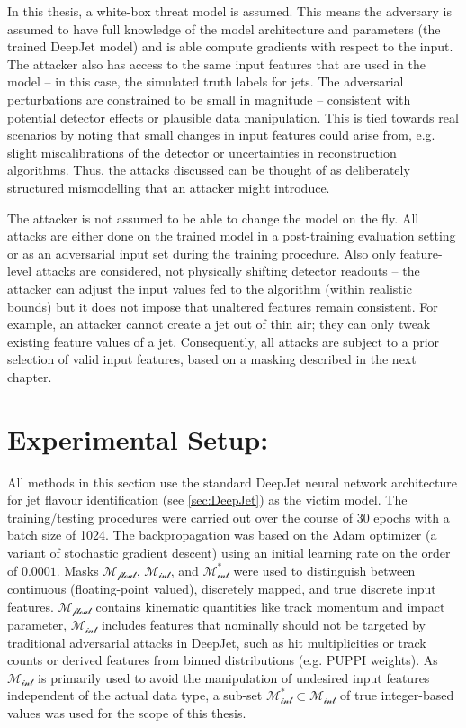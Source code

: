In this thesis, a white-box threat model is assumed. This means the adversary is assumed to have full knowledge of the model architecture and parameters (the trained DeepJet model) and is able compute gradients with respect to the input. The attacker also has access to the same input features that are used in the model – in this case, the simulated truth labels for jets. The adversarial perturbations are constrained to be small in magnitude – consistent with potential detector effects or plausible data manipulation. This is tied towards real scenarios by noting that small changes in input features could arise from, e.g. slight miscalibrations of the detector or uncertainties in reconstruction algorithms. Thus, the attacks discussed can be thought of as deliberately structured mismodelling that an attacker might introduce.

The attacker is not assumed to be able to change the model on the fly. All attacks are either done on the trained model in a post-training evaluation setting or as an adversarial input set during the training procedure. Also only feature-level attacks are considered, not physically shifting detector readouts – the attacker can adjust the input values fed to the algorithm (within realistic bounds) but it does not impose that unaltered features remain consistent. For example, an attacker cannot create a jet out of thin air; they can only tweak existing feature values of a jet. Consequently, all attacks are subject to a prior selection of valid input features, based on a masking described in the next chapter.


\section{Experimental Setup:}
All methods in this section use the standard DeepJet neural network architecture for jet flavour identification (see \ref{sec:DeepJet}) as the victim model. The training/testing procedures were carried out over the course of 30 epochs with a batch size of 1024. The backpropagation was based on the Adam optimizer (a variant of stochastic gradient descent) using an initial learning rate on the order of $0.0001$. 
Masks $\mathcal{M_{\text{float}}}$, $\mathcal{M_{\text{int}}}$, and $\mathcal{M_{\text{int}}^*}$ were used to distinguish between continuous (floating-point valued), discretely mapped, and true discrete input features. 
$\mathcal{M_{\text{float}}}$ contains kinematic quantities like track momentum and impact parameter, $\mathcal{M_{\text{int}}}$ includes features that nominally should not be targeted by traditional adversarial attacks in DeepJet, such as hit multiplicities or track counts or derived features from binned distributions (e.g. PUPPI weights). As $\mathcal{M_{\text{int}}}$ is primarily used to avoid the manipulation of undesired input features independent of the actual data type, a sub-set $\mathcal{M_{\text{int}}^*}\subset\mathcal{M_{\text{int}}}$ of true integer-based values was used for the scope of this thesis. 

